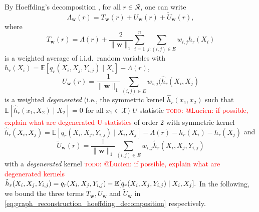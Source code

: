 \documentclass[letterpaper]{article} %
\newcommand{\E}{\mathbb{E}}
\newcommand{\weight}{\mathbf{w}}
\newcommand{\xspace}{\mathcal{X}}
\newcommand{\pair}[1]{(#1)}
\newcommand{\normo}[1]{\|#1\|_1}
\newcommand{\red}[1]{\textcolor{red}{#1}}
\newcommand{\todo}[1]{\red{\textsc{todo:} #1}}
\begin{document}
By Hoeffding's decomposition \cite{hoeffding1948class}, for all $r\in\mathcal R$, one can write
\begin{equation}
    \label{eq:graph_reconstruction_hoeffding_decomposition}
    \Lambda_\weight{}(r) = T_\weight{}(r) + U_\weight{}(r) + \widetilde{U}_\weight{}(r),
\end{equation}
where
\[T_\weight{}(r)=\Lambda(r)+\frac{2}{\normo{\weight{}}}\sum_{i=1}^n\sum_{j:\pair{i,j}\in E}w_{i,j}h_r(X_i)\]
is a weighted average of i.i.d.\ random variables with $h_r(X_i)=\E[q_r(X_i,X_j,Y_{i,j})\mid X_i]-\Lambda(r)$,
\[U_\weight{}(r)=\frac{1}{\normo{\weight{}}}\sum_{\pair{i,j}\in E} w_{i,j}(\hat{h}_r(X_i,X_j)\]
is a weighted \emph{degenerated} (i.e., the symmetric kernel $\hat{h}_r(x_1,x_2)$ such that $\E[\hat{h}_r(x_1, X_2)\mid X_2]=0$ for all $x_1\in\xspace{}$) $U$-statistic 
\todo{@Lucien: if possible, explain what are degenerated U-statistics} of order $2$ with symmetric kernel 
$\hat{h}_r(X_i,X_j)=\E[q_r(X_i,X_j,Y_{i,j})\mid X_i,X_j]-\Lambda(r)-h_r(X_i)-h_r(X_j)$ 
and
\[\widetilde{U}_\weight{}(r)=\frac{1}{\normo{\weight{}}}\sum_{\pair{i,j}\in E}w_{i,j}\tilde{h}_r(X_i,X_j,Y_{i,j})\]
with a \emph{degenerated} kernel 
\todo{@Lucien: if possible, explain what are degenerated kernels}
$\tilde{h}_r(X_i,X_j,Y_{i,j})=q_r(X_i,X_j\linebreak,Y_{i,j})-\E[q_r(X_i,X_j,Y_{i,j})\mid X_i,X_j].$ 
In the following, we bound the three terms $T_\weight{}, U_\weight{}$ and $\widetilde{U}_\weight{}$ in \eqref{eq:graph_reconstruction_hoeffding_decomposition} respectively. 

\end{document}
